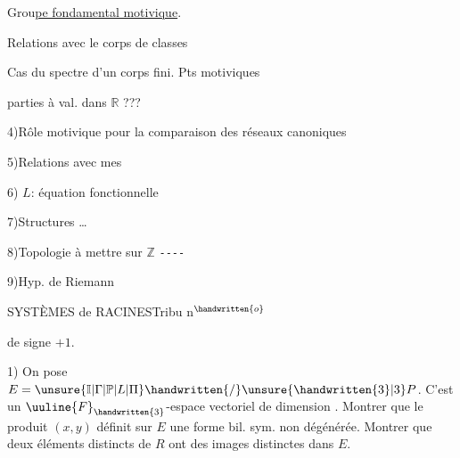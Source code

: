 Grou\uline{pe fondamental motivique}.

Relations avec le corps de classes

Cas du spectre d'un corps fini. Pts motiviques

parties à val. dans $\mathbb{R}$ ???

\margin{*}
4)\quad Rôle    motivique pour la comparaison des réseaux canoniques

5)\quad Relations  avec mes  

6)\quad {} $L$: équation fonctionnelle

7)\quad Structures \ldots

8)\quad Topologie à mettre sur $\mathbb{Z}$ \texttt{-{}-{}-{}-}

9)\quad Hyp. de Riemann 



SYSTÈMES de RACINES\hfill Tribu n$^{\handwritten{o}}$ 

de signe $+1$.

1) On pose $E=\unsure{\mathbb{I}|\Gamma|\mathbb{P}|L|\Pi}\handwritten{/}\unsure{\handwritten{3}|3}P$. C'est un $\uuline{F}_{\handwritten{3}}$-espace vectoriel de dimension . Montrer que le produit $(x,y)$ définit sur $E$ une forme bil. sym. non dégénérée. Montrer que deux éléments distincts de $R$ ont des images distinctes dans $E$.


